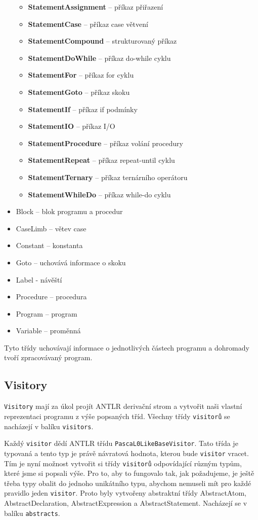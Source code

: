 \documentclass[
12pt,
a4paper,
pdftex,
czech,
titlepage
]{report}
\begin{document}
\begin{itemize}
	 \begin{itemize}
	 \item \textbf{StatementAssignment} -- příkaz přiřazení
	 \item \textbf{StatementCase} -- příkaz case větvení
	 \item \textbf{StatementCompound} -- strukturovaný příkaz
	 \item \textbf{StatementDoWhile} -- příkaz do-while cyklu
	 \item \textbf{StatementFor} -- příkaz for cyklu
	 \item \textbf{StatementGoto} -- příkaz skoku
	 \item \textbf{StatementIf} -- příkaz if podmínky
	 \item \textbf{StatementIO} -- příkaz I/O
	 \item \textbf{StatementProcedure} -- příkaz volání procedury
	 \item \textbf{StatementRepeat} -- příkaz repeat-until cyklu
	 \item \textbf{StatementTernary} -- příkaz ternárního operátoru
	 \item \textbf{StatementWhileDo} -- příkaz while-do cyklu
	 \end{itemize}
\item Block -- blok programu a procedur
\item CaseLimb -- větev case
\item Constant -- konstanta
\item Goto -- uchovává informace o skoku
\item Label - návěští
\item Procedure -- procedura
\item Program -- program
\item Variable -- proměnná	 
\end{itemize}
 
	Tyto třídy uchovávají informace o jednotlivých částech programu a dohromady tvoří zpracovávaný program.
 
\subsection{Visitory}

	\texttt{Visitory} mají za úkol projít ANTLR derivační strom a vytvořit naši vlastní reprezentaci programu z výše popsaných tříd. Všechny třídy \texttt{visitorů} se nacházejí v balíku \texttt{visitors}.
	
	Každý \texttt{visitor} dědí ANTLR třídu \texttt{PascaL0LikeBaseVisitor}. Tato třída je typovaná a tento typ je právě návratová hodnota, kterou bude \texttt{visitor} vracet. Tím je nyní možnost vytvořit si třídy \texttt{visitorů} odpovídající různým typům, které jsme si popsali výše. Pro to, aby to fungovalo tak, jak požadujeme, je ještě třeba typy obalit do jednoho unikátního typu, abychom nemuseli mít pro každé pravidlo jeden \texttt{visitor}. Proto byly vytvořeny abstraktní třídy AbstractAtom, AbstractDeclaration, AbstractExpression a AbstractStatement. Nacházejí se v balíku \texttt{abstracts}. 
	 
\end{document}
